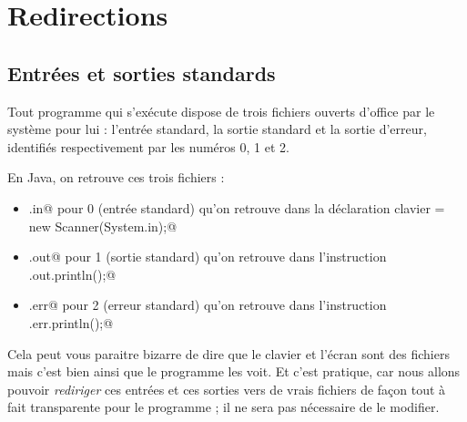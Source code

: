 \documentclass[11pt,a4paper]{article}
\begin{document}
			\par\medskip\section{Redirections}\subsection{Entr\'ees et sorties standards}
			\begin{boxedminipage}[h]{\linewidth}
		
						Tout programme qui s'ex\'ecute dispose 
						de trois fichiers ouverts d'office 
						par le syst\`eme pour lui :
						l'entr\'ee standard, la sortie standard et la sortie d'erreur,
						identifi\'es respectivement par les num\'eros 0, 1 et 2.
					
            \par
        
						En Java, on retrouve ces trois fichiers :
					
            \par
        
					\begin{itemize}
				
			\item \verb@System.in@
						pour 0 (entr\'ee standard) 
						qu'on retrouve dans la d\'eclaration
						\verb@Scanner clavier = new Scanner(System.in);@
			\item \verb@System.out@
						pour 1 (sortie standard) 
						qu'on retrouve dans l'instruction
						\verb@System.out.println();@
			\item \verb@System.err@
						pour 2 (erreur standard) 
						qu'on retrouve dans l'instruction
						\verb@System.err.println();@
					\end{itemize}
				
			\end{boxedminipage}

					Cela peut vous paraitre bizarre de dire
					que le clavier et l'\'ecran sont des fichiers
					mais c'est bien ainsi que le programme
					les voit.
					Et c'est pratique,
					car nous allons pouvoir
					\textit{rediriger}
					ces entr\'ees et ces sorties vers de vrais fichiers
					de fa\c con tout \`a fait transparente pour le
					programme ; il ne sera pas n\'ecessaire de le modifier.
				
\end{document}
